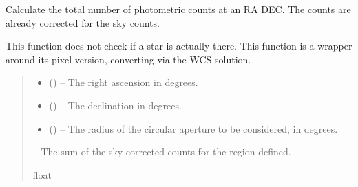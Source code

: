 \documentclass[letterpaper,11pt,english]{sphinxmanual}
\begin{document}
\begin{savenotes}
\begin{fulllineitems}

\begin{savenotes}\begin{fulllineitems}
\label{\detokenize{code/opihiexarata.photometry.solution:opihiexarata.photometry.solution.PhotometricSolution.calculate_star_photon_counts_coordinate}}
\pysigstartsignatures
{}
\pysigstopsignatures
\sphinxAtStartPar
Calculate the total number of photometric counts at an RA DEC. The
counts are already corrected for the sky counts.

\sphinxAtStartPar
This function does not check if a star is actually there. This function
is a wrapper around its pixel version, converting via the WCS solution.
\begin{quote}\begin{description}
\begin{itemize}
\item {} 
\sphinxAtStartPar
{} () – The right ascension in degrees.

\item {} 
\sphinxAtStartPar
{} () – The declination in degrees.

\item {} 
\sphinxAtStartPar
{} () – The radius of the circular aperture to be considered, in degrees.

\end{itemize}

\sphinxAtStartPar
{} – The sum of the sky corrected counts for the region defined.

\sphinxAtStartPar
float


\end{description}
\end{quote}
\end{fulllineitems}
\end{savenotes}
\end{fulllineitems}
\end{savenotes}
\end{document}

